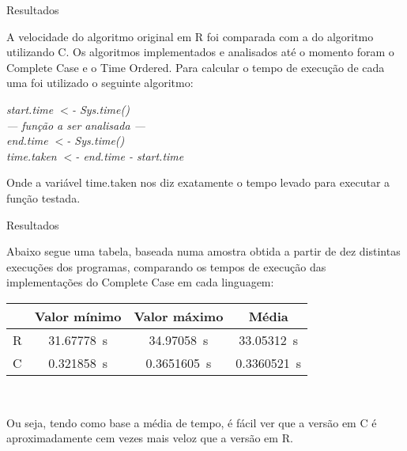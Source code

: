 \documentclass{beamer} %
\begin{document}
\begin{frame}{Resultados}

A velocidade do algoritmo original em R foi comparada com a do algoritmo utilizando C. Os algoritmos implementados e analisados até o momento foram o Complete Case e o Time Ordered. Para calcular o tempo de execução de cada uma foi utilizado o seguinte algoritmo:
    
\begin{flushleft}
\textit{start.time $<$- Sys.time()\\
--- função a ser analisada ---\\
end.time $<$- Sys.time()\\
time.taken $<$- end.time - start.time\\}
\end{flushleft}

Onde a variável time.taken nos diz exatamente o tempo levado para executar a função testada.
    
\end{frame}

\begin{frame}{Resultados}
    
Abaixo segue uma tabela, baseada numa amostra obtida a partir de dez distintas execuções dos programas, comparando os tempos de execução das implementações do Complete Case em cada linguagem:\\
\vspace{0.3cm}

\begin{tabular}{|c|c|c|c|}
     \hline
      & Valor mínimo & Valor máximo & Média\\
      \hline
      R & \SI{31.67778}{\second} & \SI{34.97058}{\second} & \SI{33.05312}{\second}\\
      \hline
      C & \SI{0.321858}{\second} & \SI{0.3651605}{\second} & \SI{0.3360521}{\second}\\
      \hline
\end{tabular}\\
\vspace{0.3cm}

Ou seja, tendo como base a média de tempo, é fácil ver que a versão em C é aproximadamente cem vezes mais veloz que a versão em R.
    
\end{frame}
\end{document}
